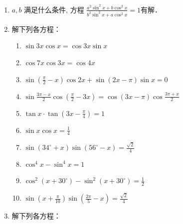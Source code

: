 \begin{enumerate}
\item $a, b$ 满足什么条件, 方程
$
\frac{a^{2} \sin^{2} x+b \cos^{2} x}{b^{2} \sin ^{2} x+a \cos^{2} x}=1
$有解．
\item 解下列各方程：
\begin{enumerate}
\item $\sin 3 x \cos x=\cos 3 x \sin x$
\item $\cos 7 x \cos 3 x=\cos 4 x$
\item $\sin \left(\frac{\pi}{2}-x\right) \cos 2 x+\sin (2 x-\pi) \sin x=0$
\item  $\sin \frac{3 \pi-x}{2} \cos \left(\frac{\pi}{2}-3 x\right) =\cos (3 x-\pi) \cos \frac{3 \pi+x}{2}$
\item $\tan x\cdot \tan\left(3x-\frac{\pi}{4}\right)=1$
\item $\sin x\cos x=\frac{1}{4}$
\item $\sin(34^{\circ}+x)\sin(56^{\circ}-x)=\frac{\sqrt{2}}{4}$
\item $\cos^4x-\sin^4x=1$
\item $\cos ^{2}\left(x+30^{\circ}\right)-\sin ^{2}\left(x+30^{\circ}\right)=\frac{1}{2}$
\item $\sin \left(x+\frac{\pi}{10}\right) \sin \left(\frac{2 \pi}{5}-x\right)=\frac{\sqrt{2}}{4}$
\end{enumerate}

\item 解下列各方程：


\end{enumerate}

